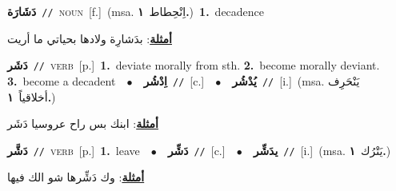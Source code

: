 \documentclass[10pt,a4paper,twoside]{article} %
\begin{document}
\begin{multicols}{2}
{\setlength\topsep{0pt}\textbf{\foreignlanguage{arabic}{دَشَارَة}}\ {\color{gray}\texttt{//}\color{black}}\ \textsc{noun}\ [f.]\ \color{gray}(msa. \foreignlanguage{arabic}{اِنْحِطاط}~\foreignlanguage{arabic}{\textbf{١.}})\color{black}\ \textbf{1.}~decadence\  \begin{flushright}\color{gray}\foreignlanguage{arabic}{\textbf{\underline{\foreignlanguage{arabic}{أمثلة}}}: بدَشارِة ولادها بحياتي ما أريت}\end{flushright}\color{black}} \vspace{2mm}

{\setlength\topsep{0pt}\textbf{\foreignlanguage{arabic}{دَشَر}}\ {\color{gray}\texttt{//}\color{black}}\ \textsc{verb}\ [p.]\ \textbf{1.}~deviate morally from sth.  \textbf{2.}~become morally deviant.  \textbf{3.}~become a decadent\ \ $\bullet$\ \ \setlength\topsep{0pt}\textbf{\foreignlanguage{arabic}{اِدْشُر}}\ {\color{gray}\texttt{//}\color{black}}\ [c.]\ \ $\bullet$\ \ \setlength\topsep{0pt}\textbf{\foreignlanguage{arabic}{يُدْشُر}}\ {\color{gray}\texttt{//}\color{black}}\ [i.]\ \color{gray}(msa. \foreignlanguage{arabic}{يَنْحَرِف أخلاقياً}~\foreignlanguage{arabic}{\textbf{١.}})\color{black}\  \begin{flushright}\color{gray}\foreignlanguage{arabic}{\textbf{\underline{\foreignlanguage{arabic}{أمثلة}}}: ابنك بس راح عروسيا دَشَر}\end{flushright}\color{black}} \vspace{2mm}

{\setlength\topsep{0pt}\textbf{\foreignlanguage{arabic}{دَشَّر}}\ {\color{gray}\texttt{//}\color{black}}\ \textsc{verb}\ [p.]\ \textbf{1.}~leave\ \ $\bullet$\ \ \setlength\topsep{0pt}\textbf{\foreignlanguage{arabic}{دَشِّر}}\ {\color{gray}\texttt{//}\color{black}}\ [c.]\ \ $\bullet$\ \ \setlength\topsep{0pt}\textbf{\foreignlanguage{arabic}{يدَشِّر}}\ {\color{gray}\texttt{//}\color{black}}\ [i.]\ \color{gray}(msa. \foreignlanguage{arabic}{يَتْرُك}~\foreignlanguage{arabic}{\textbf{١.}})\color{black}\  \begin{flushright}\color{gray}\foreignlanguage{arabic}{\textbf{\underline{\foreignlanguage{arabic}{أمثلة}}}: وك دَشِّرها شو الك فيها}\end{flushright}\color{black}} \vspace{2mm}


\end{multicols}
\end{document}
